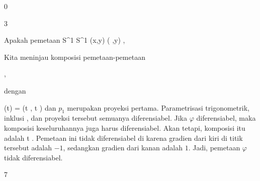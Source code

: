 {0}

{

}
{  }



{3}

{

Apakah pemetaan
\maabbeledisp {\varphi} {S^1} {S^1
} {(x,y)} {(  ,y)
} {,}

}
{

Kita meninjau komposisi pemetaan-pemetaan

 { , }

dengan

\mavergleichskettedisp
{\vergleichskette
{ \theta(t)
}
{ =} {(\cos  t , \sin  t )
}
{ } {
}
{ } {
}
{ } {
}
}
{}{}{}
dan $p_1$ merupakan proyeksi pertama. Parametrisasi trigonometrik, inklusi
 {} {,}
dan proyeksi tersebut semuanya diferensiabel. Jika $\varphi$ diferensiabel, maka komposisi keseluruhannya juga harus diferensiabel. Akan tetapi, komposisi itu adalah
\maabbeledisp {} {\R} {\R
} { t } {
} {.}
Pemetaan ini tidak diferensiabel di
 karena gradien dari kiri di titik tersebut adalah $-1$, sedangkan gradien dari kanan adalah $1$. Jadi, pemetaan $\varphi$ tidak diferensiabel.

 }



{7}

